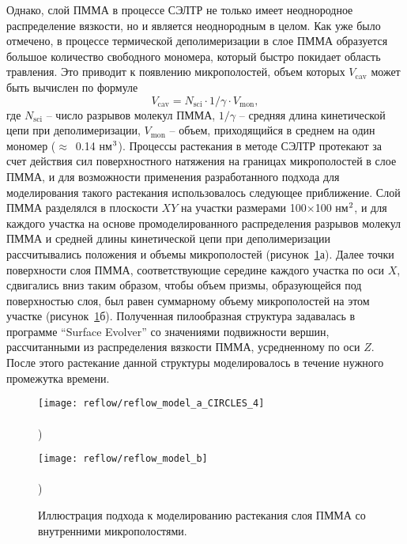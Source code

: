 Однако, слой ПММА в процессе СЭЛТР не только имеет неоднородное распределение вязкости, но и является неоднородным в целом.
Как уже было отмечено, в процессе термической деполимеризации в слое ПММА образуется большое количество свободного мономера, который быстро покидает область травления.
Это приводит к появлению микрополостей, объем которых $V_\mathrm{cav}$ может быть вычислен по формуле
\begin{equation}
	V_\mathrm{cav} = N_\mathrm{sci} \cdot 1/\gamma \cdot V_\mathrm{mon},
\end{equation}
где $N_\text{sci}$ -- число разрывов молекул ПММА, $1/\gamma$ -- средняя длина кинетической цепи при деполимеризации, $V_\mathrm{mon}$ -- объем, приходящийся в среднем на один мономер ($\approx$~0.14 нм$^\text{3}$).
Процессы растекания в методе СЭЛТР протекают за счет действия сил поверхностного натяжения на границах микрополостей в слое \linebreak ПММА, и для возможности применения разработанного подхода для моделирования такого растекания использовалось следующее приближение.
Слой ПММА разделялся в плоскости $XY$ на участки размерами 100$\times$100 нм$^\text{2}$, и для каждого участка на основе промоделированного распределения разрывов молекул \linebreak ПММА и средней длины кинетической цепи при деполимеризации рассчитывались положения и объемы микрополостей (рисунок~\ref{fig:reflow_surface}а).
Далее точки поверхности слоя ПММА, соответствующие середине каждого участка по оси $X$, сдвигались вниз таким образом, чтобы объем призмы, образующейся под поверхностью слоя, был равен суммарному объему микрополостей на этом участке (рисунок~\ref{fig:reflow_surface}б).
Полученная пилообразная структура задавалась в программе ``Surface Evolver'' со значениями подвижности вершин, рассчитанными из распределения вязкости ПММА, усредненному по оси $Z$.
После этого растекание данной структуры моделировалось в течение нужного промежутка времени.

\begin{figure}[h]
	\begin{minipage}{0.48\textwidth}
		\texttt{[image: reflow/reflow\_model\_a\_CIRCLES\_4]} \\
		\vspace{-28.5ex} \\ ) \\ \vspace{28.5ex}
	\end{minipage}
	\begin{minipage}{0.48\textwidth}
		\texttt{[image: reflow/reflow\_model\_b]} \\
		\vspace{-28.5ex} \\ ) \\ \vspace{28.5ex}
	\end{minipage}
	\vspace{-3.5em}
	\caption{Иллюстрация подхода к моделированию растекания слоя ПММА со внутренними микрополостями.}
	\label{fig:reflow_surface}
\end{figure}
